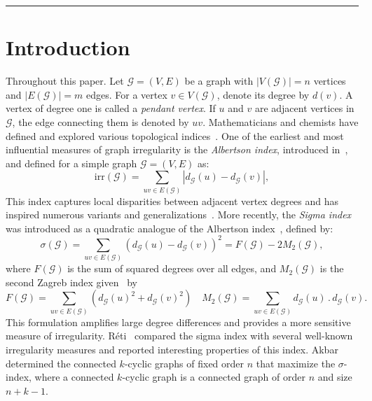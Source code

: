 \documentclass[12pt, a4paper]{article}
\theoremstyle{plain}  %
\theoremstyle{definition}  %
\newcommand{\GG}{\mathcal{G}}
\begin{document}
\noindent\rule{12.2cm}{1.0pt}

\section{Introduction}
Throughout this paper. Let $\GG=(V,E)$ be a graph with $|V(\GG)|=n$ vertices and $|E(\GG)|=m$ edges. 
For a vertex $v \in V(\GG)$, denote its degree by $d(v)$. 
A vertex of degree one is called a \emph{pendant vertex}. 
If $u$ and $v$ are adjacent vertices in $\GG$, the edge connecting them is denoted by $uv$.
Mathematicians and chemists have defined and explored various topological indices~\cite{gutman2018inverse,Todeschini2000,Todeschini2009}. 
One of the earliest and most influential measures of graph irregularity is the \emph{Albertson index}, introduced in~\cite{albertson1997irregularity}, and defined for a simple graph $\GG=(V,E)$ as:
$$
\mathrm{irr}(\GG)=\sum_{uv \in E(\GG)} |d_\GG(u)-d_\GG(v)|,
$$
This index captures local disparities between adjacent vertex degrees and has inspired numerous variants and generalizations~\cite{abdo2014total,abdo2019graph}. More recently, the \emph{Sigma index} was introduced as a quadratic analogue of the Albertson index~\cite{gutman2018inverse}, defined by:
$$
\sigma(\GG)=\sum_{uv \in E(\GG)} (d_\GG(u)-d_\GG(v))^2=F(\GG)-2M_2(\GG),
$$
where $F(\GG)$ is the sum of squared degrees over all edges, and $M_2(\GG)$ is the second Zagreb index given~\cite{gutman1972total, gutman1975acyclic} by 
\[
F(\GG)=\sum_{uv\in E(\GG)} (d_\GG(u)^2+d_\GG(v)^2) \quad M_2(\GG)=\sum_{uv\in E(\GG)} d_\GG(u)\,.\,d_\GG(v).
\]
This formulation amplifies large degree differences and provides a more sensitive measure of irregularity. Réti~\cite{Reti2019} compared the sigma index with several well-known irregularity measures and reported interesting properties of this index. Akbar~\cite{Akbar2023} determined the connected $k$-cyclic graphs of fixed order $n$ that maximize the $\sigma$-index, where a connected $k$-cyclic graph is a connected graph of order $n$ and size $n+k-1$.






\end{document}
